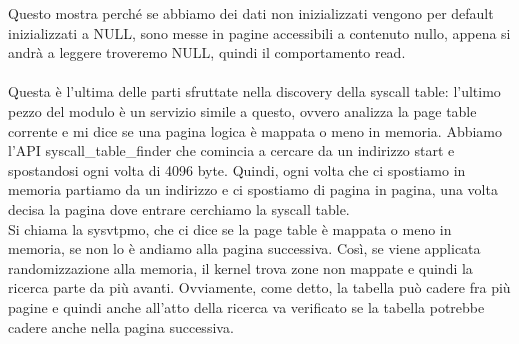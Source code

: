 \documentclass[12pt, oneside]{extbook}
\begin{document}
Questo mostra perché se abbiamo dei dati non inizializzati vengono per default inizializzati a NULL, sono messe in pagine accessibili a contenuto nullo, appena si andrà a leggere troveremo NULL, quindi il comportamento read.\\\\ Questa è l'ultima delle parti sfruttate nella discovery della syscall table: l'ultimo pezzo del modulo è un servizio simile a questo, ovvero analizza la page table corrente e mi dice se una pagina logica è mappata o meno in memoria. Abbiamo l'API \textsf{syscall\_table\_finder} che comincia a cercare da un indirizzo start e spostandosi ogni volta di 4096 byte. Quindi, ogni volta che ci spostiamo in memoria partiamo da un indirizzo e ci spostiamo di pagina in pagina, una volta decisa la pagina dove entrare cerchiamo la syscall table.\\ Si chiama la \textsf{sysvtpmo}, che ci dice se la page table è mappata o meno in memoria, se non lo è andiamo alla pagina successiva. Così, se viene applicata randomizzazione alla memoria, il kernel trova zone non mappate e quindi la ricerca parte da più avanti. Ovviamente, come detto, la tabella può cadere fra più pagine e quindi anche all'atto della ricerca va verificato se la tabella potrebbe cadere anche nella pagina successiva.
\end{document}
